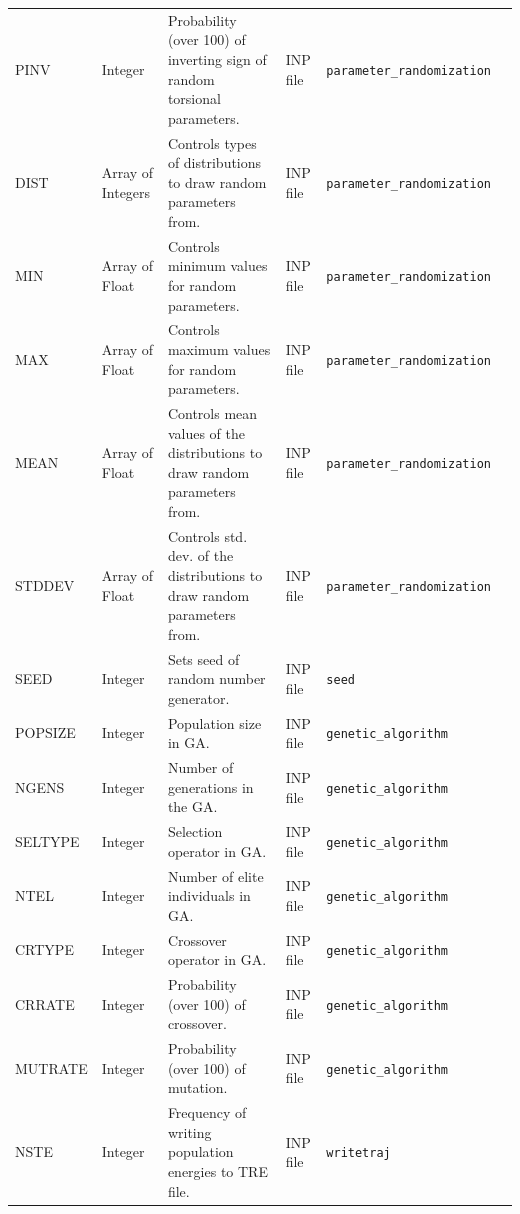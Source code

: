 \documentclass[10pt,a4paper]{report}
\numberwithin{equation}{section}
\begin{document}
\begin{landscape}
\begin{center}
\begin{longtable}{llllll}
      PINV & Integer & Probability (over 100) of inverting sign of random torsional parameters. & INP file & \texttt{parameter\_randomization} & \autopageref{descr:pinv}\\
      DIST & Array of Integers & Controls types of distributions to draw random parameters from. & INP file & \texttt{parameter\_randomization} & \autopageref{descr:dist}\\
      MIN & Array of Float & Controls minimum values for random parameters. & INP file & \texttt{parameter\_randomization} & \autopageref{descr:min}\\
      MAX & Array of Float & Controls maximum values for random parameters. & INP file & \texttt{parameter\_randomization} & \autopageref{descr:max}\\
      MEAN & Array of Float & Controls mean values of the distributions to draw random parameters from. & INP file & \texttt{parameter\_randomization} & \autopageref{descr:mean}\\
      STDDEV & Array of Float & Controls std. dev. of the distributions to draw random parameters from. & INP file & \texttt{parameter\_randomization} & \autopageref{descr:stddev}\\
      SEED & Integer & Sets seed of random number generator. & INP file & \texttt{seed} & \autopageref{descr:seed}\\
      POPSIZE & Integer & Population size in GA. & INP file & \texttt{genetic\_algorithm} & \autopageref{descr:popsize}\\
      NGENS & Integer & Number of generations in the GA. & INP file & \texttt{genetic\_algorithm} & \autopageref{descr:ngens}\\
      SELTYPE & Integer & Selection operator in GA. & INP file & \texttt{genetic\_algorithm} & \autopageref{descr:seltype}\\
      NTEL & Integer & Number of elite individuals in GA. & INP file & \texttt{genetic\_algorithm} & \autopageref{descr:ntel}\\
      CRTYPE & Integer & Crossover operator in GA. & INP file & \texttt{genetic\_algorithm} & \autopageref{descr:crtype}\\
      CRRATE & Integer & Probability (over 100) of crossover. & INP file & \texttt{genetic\_algorithm} & \autopageref{descr:crrate}\\
      MUTRATE & Integer & Probability (over 100) of mutation. & INP file & \texttt{genetic\_algorithm} & \autopageref{descr:mutrate}\\
      NSTE & Integer & Frequency of writing population energies to TRE file. & INP file & \texttt{writetraj} & \autopageref{descr:nste}\\

\end{longtable}
\end{center}
\end{landscape}
\end{document}
